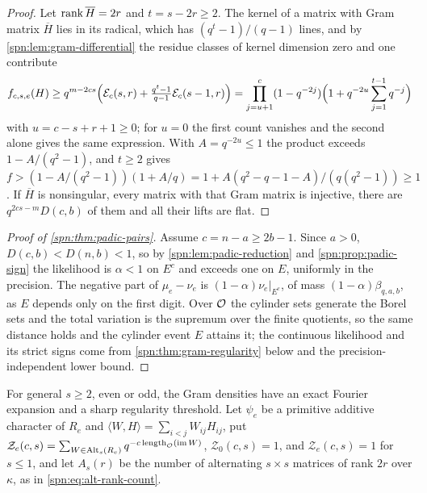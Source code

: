 \begin{proof}
Let $\operatorname{rank}\overline H=2r$ and $t=s-2r\ge2$. The kernel of a matrix with Gram matrix $\overline H$
lies in its radical, which has $(q^t-1)/(q-1)$ lines, and by \cref{spn:lem:gram-differential} the
residue classes of kernel dimension zero and one contribute
\[
 f_{c,s,e}(H)\ge q^{m-2cs}\Bigl(\mathcal{E}_c(s,r)+\tfrac{q^t-1}{q-1}\mathcal{E}_c(s-1,r)\Bigr)
 =\prod_{j=u+1}^{c}(1-q^{-2j})\Bigl(1+q^{-2u}\sum_{j=1}^{t-1}q^{-j}\Bigr)
\]
with $u=c-s+r+1\ge0$; for $u=0$ the first count vanishes and the second alone gives the same
expression. With $A=q^{-2u}\le1$ the product exceeds $1-A/(q^2-1)$, and $t\ge2$ gives
$f>(1-A/(q^2-1))(1+A/q)=1+A(q^2-q-1-A)/(q(q^2-1))\ge1$. If $\overline H$ is nonsingular, every matrix
with that Gram matrix is injective, there are $q^{2cs-m}D(c,b)$ of them and all their lifts are flat.
\end{proof}

\begin{proof}[Proof of \cref{spn:thm:padic-pairs}]
Assume $c=n-a\ge2b-1$. Since $a>0$, $D(c,b)<D(n,b)<1$, so by \cref{spn:lem:padic-reduction} and
\cref{spn:prop:padic-sign} the likelihood is $\alpha<1$ on $E^c$ and exceeds one on $E$, uniformly in
the precision. The negative part of $\mu_e-\nu_e$ is $(1-\alpha)\nu_e|_{E^c}$, of mass
$(1-\alpha)\beta_{q,a,b}$, as $E$ depends only on the first digit. Over $\mathcal{O}$ the cylinder sets
generate the Borel sets and the total variation is the supremum over the finite quotients, so the
same distance holds and the cylinder event $E$ attains it; the continuous likelihood and its strict
signs come from \cref{spn:thm:gram-regularity} below and the precision-independent lower bound.
\end{proof}

For general $s\ge2$, even or odd, the Gram densities have an exact Fourier expansion and a sharp
regularity threshold. Let $\psi_e$ be a primitive additive character of $R_e$ and
$\langle W,H\rangle=\sum_{i<j}W_{ij}H_{ij}$, put
$\mathcal Z_e(c,s)=\sum_{W\in\operatorname{Alt}_s(R_e)}q^{-c\,\mathrm{length}_{\mathcal{O}}(\operatorname{im} W)}$, $\mathcal Z_0(c,s)=1$, and
$\mathcal Z_e(c,s)=1$ for $s\le1$, and let $A_s(r)$ be the number of alternating $s\times s$ matrices of rank
$2r$ over $\kappa$, as in \eqref{spn:eq:alt-rank-count}.

